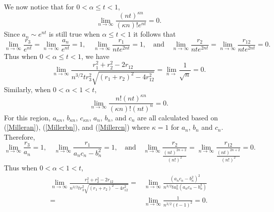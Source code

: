\documentclass[12pt]{amsart}
\theoremstyle{remark}
\begin{document}
We now notice that for $0<\alpha\le t<1$,
\[\lim_{n\rightarrow\infty}\frac{(nt)^{\kappa n}}{(\kappa n)!e^{nt}}=0.\]
Since $a_n\sim e^{nt}$ is still true when $\alpha\le t<1$ it follows that
\[\lim_{n\rightarrow\infty}\frac{r_3}{e^{nt}}=\lim_{n\rightarrow\infty}\frac{a_n}{e^{nt}}=1,\quad\lim_{n\rightarrow\infty}\frac{r_1}{nte^{2nt}}=1,\quad\text{and}\quad\lim_{n\rightarrow\infty}\frac{r_2}{nte^{2nt}}=\lim_{n\rightarrow\infty}\frac{r_{12}}{nte^{2nt}}=0.\]
Thus when $0<\alpha\le t<1$, we have
\[\lim_{n\rightarrow\infty}\frac{r_1^2+r_2^2-2r_{12}}{n^{3/2}tr_3^2\sqrt{(r_1+r_2)^2-4r_{12}^2}}=\lim_{n\rightarrow}\frac{1}{\sqrt{n}}=0.\]
Similarly, when $0<\alpha<1<t$,
\[\lim_{n\rightarrow\infty}\frac{n!(nt)^{\kappa n}}{(\kappa n)!(nt)^{n}}=0.\]
For this region, $a_{\kappa n}$, $b_{\kappa n}$, $c_{\kappa n}$, $a_n$, $b_n$, and $c_n$ are all calculated based on (\ref{Milleran}), (\ref{Millerbn}), and (\ref{Millercn}) where $\kappa=1$ for $a_n$, $b_n$ and $c_n$.  Therefore,
\[\lim_{n\rightarrow\infty}\frac{r_3}{a_n}=1,\quad\lim_{n\rightarrow\infty}\frac{r_1}{a_nc_n-b_n^2}=1,\quad\text{and}\quad\lim_{n\rightarrow\infty}\frac{r_2}{\frac{(nt)^{2n+2}}{(n!)^2}}=\lim_{n\rightarrow\infty}\frac{r_{12}}{\frac{(nt)^{2n+2}}{(n!)^2}}=0.\]
Thus when $0<\alpha<1<t$,
\begin{align*}
	\lim_{n\rightarrow\infty}\frac{r_1^2+r_2^2-2r_{12}}
	{n^{3/2}tr_3^2\sqrt{(r_1+r_2)^2-4r_{12}^2}}
	=&\lim_{n\rightarrow\infty}\frac{(a_nc_n-b_n^2)^2}
	{n^{3/2}ta_n^2(a_nc_n-b_n^2)}
	\\=&\lim_{n\rightarrow\infty}\frac{1}{n^{3/2}(t-1)^2}=0.
\end{align*}
\end{document}
